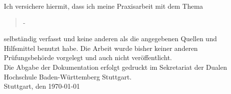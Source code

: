 Ich versichere hiermit, dass ich meine Praxisarbeit mit dem Thema
\begin{quote}
\textit{\titel} -\textit{ \untertitel }
\end{quote}
selbständig verfasst und keine anderen als die angegebenen Quellen und Hilfsmittel benutzt habe. Die Arbeit wurde bisher keiner anderen Prüfungsbehörde vorgelegt und auch nicht veröffentlicht. \\Die Abgabe der Dokumentation erfolgt gedruckt im Sekretariat der Dualen Hochschule Baden-Württemberg Stuttgart.\\[10ex]

Stuttgart, den \today \\[4ex]


\begin{figure}[h]
\end{figure}
\textsc{\autor} \\[10ex]
